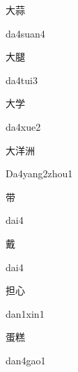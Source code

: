 \begin{verbete}[da4suan4]{大蒜}
\begin{pronuncia}{da4suan4}
\end{pronuncia}
\end{verbete}

\begin{verbete}[da4tui3]{大腿}
\begin{pronuncia}{da4tui3}
\end{pronuncia}
\end{verbete}

\begin{verbete}[da4xue2]{大学}
\begin{pronuncia}{da4xue2}
\end{pronuncia}
\end{verbete}

\begin{verbete}{大洋洲}
\begin{pronuncia}{Da4yang2zhou1}
\end{pronuncia}
\end{verbete}

\begin{verbete}[dai4]{带}
\begin{pronuncia}{dai4}
\end{pronuncia}
\end{verbete}

\begin{verbete}[dai4]{戴}
\begin{pronuncia}{dai4}
\end{pronuncia}
\end{verbete}

\begin{verbete}{担心}
\begin{pronuncia}{dan1xin1}
\end{pronuncia}
\end{verbete}

\begin{verbete}{蛋糕}
\begin{pronuncia}{dan4gao1}
\end{pronuncia}
\end{verbete}


